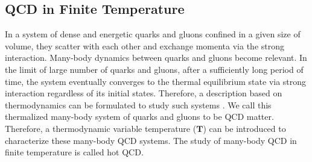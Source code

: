 \subsection{QCD in Finite Temperature} 


In a system of dense and energetic quarks and gluons confined in a given size of volume, they scatter with each other and exchange momenta via the strong interaction. Many-body dynamics between quarks and gluons become relevant. In the limit of large number of quarks and gluons, after a sufficiently long period of time, the system eventually converges to the thermal equilibrium state via strong interaction \cite{MLBThermal,ADSCFTThermal,QCDThermal} regardless of its initial states. Therefore, a description based on thermodynamics can be formulated to study such systems \cite{QCDThemDyn}. We call this thermalized many-body system of quarks and gluons to be QCD matter. Therefore, a thermodynamic variable temperature ($\mathbf{T}$) can be introduced to characterize these many-body QCD systems. The study of many-body QCD in finite temperature is called hot QCD. 



